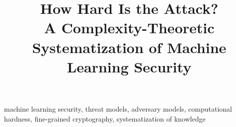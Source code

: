 \documentclass[conference,compsoc]{IEEEtran}
\begin{document}
\title{How Hard Is the Attack?\\
A Complexity-Theoretic Systematization of Machine Learning Security}

\author{
}

\maketitle

\nocite{*}

\begin{abstract}

\end{abstract}

\begin{IEEEkeywords}
machine learning security, threat models, adversary models, computational
hardness, fine-grained cryptography, systematization of knowledge
\end{IEEEkeywords}













\end{document}
